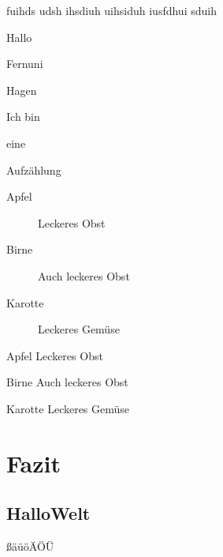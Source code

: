 \documentclass[12pt,ngerman,parskip=full]{scrreprt}
\begin{document}
fuihds udsh ihsdiuh uihsiduh iusfdhui sduih 

\begin{compactenum}[A)] \setcounter{enumi}{6}
	\item Hallo 
	\item Fernuni
	\item Hagen
	\item Ich bin
	\item eine 
	\item Aufzählung
\end{compactenum}

\begin{description}
\item[Apfel] Leckeres Obst
\item[Birne] Auch leckeres Obst
\item[Karotte] Leckeres Gemüse
\end{description}

\begin{compactdesc}
\item[Apfel] Leckeres Obst
\item[Birne] Auch leckeres Obst
\item[Karotte] Leckeres Gemüse
\end{compactdesc}


\chapter{Fazit}\label{cha:fazit}

\section{HalloWelt}\label{sec:hallo}

ßäüöÄÖÜ

\blindtext[2]  

\blindtext[2]  

\blindtext[2]  
\end{document}
